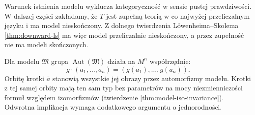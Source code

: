 Warunek istnienia modelu wyklucza kategoryczność
w sensie pustej prawdziwości. W dalszej części
zakładamy, że $T$ jest zupełną teorią w co najwyżej
przeliczalnym języku i ma model nieskończony.
Z dolnego twierdzenia Löwenheima--Skolema
\ref{thm:downward-ls} ma więc model przeliczalnie
nieskończony, a przez zupełność nie ma modeli
skończonych.

Dla modelu $\mathfrak M$ grupa
$\operatorname{Aut}(\mathfrak M)$ działa na
$M^n$ współrzędnie:
\[
g\cdot(a_1,\ldots,a_n)=(g(a_1),\ldots,g(a_n)).
\]
Orbitę krotki $\bar a$ stanowią wszystkie
jej obrazy przez automorfizmy modelu.
Krotki z tej samej orbity mają ten sam typ
bez parametrów na mocy niezmienniczości
formuł względem izomorfizmów
(twierdzenie \ref{thm:model-iso-invariance}).
Odwrotna implikacja wymaga dodatkowego argumentu
o jednorodności.

